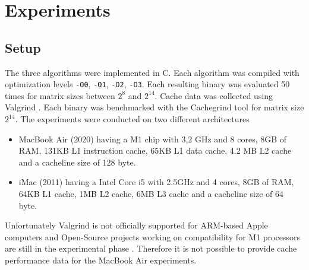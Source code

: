 \documentclass{scrartcl}
\begin{document}
    \section{Experiments} \label{sec:experiments}
    \subsection{Setup}
    The three algorithms were implemented in C. Each algorithm was compiled with optimization levels \texttt{-O0}, \texttt{-O1}, \texttt{-O2}, \texttt{-O3}. Each resulting binary was evaluated 50 times for matrix sizes between $2^8$ and $2^{14}$. Cache data was collected using Valgrind \cite{valgrind}. Each binary was benchmarked with the Cachegrind tool for matrix size $2^{14}$. The experiments were conducted on two different architectures
    \begin{itemize}
        \item MacBook Air (2020) having a M1 chip with 3,2 GHz and 8 cores, 8GB of RAM, 131KB L1 instruction cache, 65KB L1 data cache, 4.2 MB L2 cache and a cacheline size of 128 byte.
        \item iMac (2011) having a Intel Core i5 with 2.5GHz and 4 cores, 8GB of RAM, 64KB L1 cache, 1MB L2 cache, 6MB L3 cache and a cacheline size of 64 byte.
    \end{itemize}
    Unfortunately Valgrind is not officially supported for ARM-based Apple computers \cite{valgrinddocs} and Open-Source projects working on compatibility for M1 processors are still in the experimental phase \cite{valgrindm1bug}. Therefore it is not possible to provide cache performance data for the MacBook Air experiments. 
\end{document}
